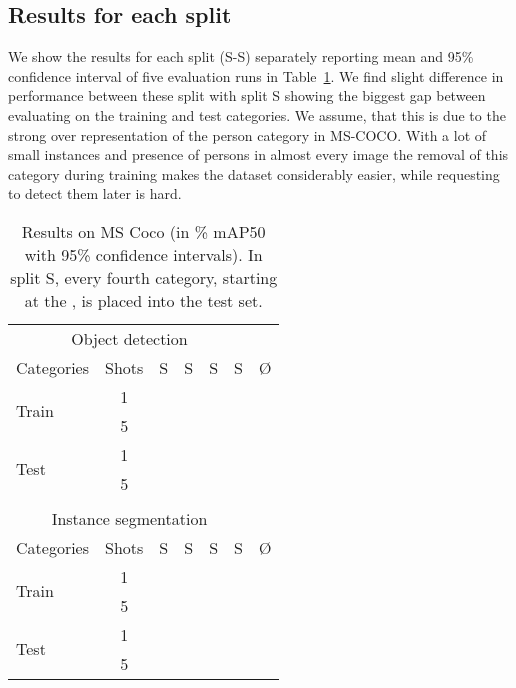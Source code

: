\documentclass{article}
\newcommand{\coco}{MS-COCO\xspace}
\begin{document}
\subsection{Results for each split}

We show the results for each split (S-S) separately reporting mean and 95\% confidence interval of five evaluation runs in Table~\ref{table:results_by_split}. We find slight difference in performance between these split with split S showing the biggest gap between evaluating on the training and test categories. We assume, that this is due to the strong over representation of the person category in \coco \cite{Lin2014}. With a lot of small instances and presence of persons in almost every image the removal of this category during training makes the dataset considerably easier, while requesting to detect them later is hard.

\begin{table}[h]
\begin{center}
\begin{small}
\begin{tabular}{lcccccc}
 \multicolumn{6}{c}{Object detection\vspace{4pt}}\\
Categories & Shots & S & S & S & S & \O\\
\hline
\multirow{2}{*}{Train} & 1 &  &  &  &  &  \\
 & 5 &  &  &  &  &  \\
\hline
\multirow{2}{*}{Test} & 1 &  &  &  &  &  \\ 
 & 5 &  &  &  &  &  \\
\multicolumn{6}{c}{}\\
 \multicolumn{6}{c}{Instance segmentation\vspace{4pt}} \\
Categories  & Shots & S & S & S & S & \O\\
 \hline
\multirow{2}{*}{Train} & 1 &  &  &  &  &  \\
 & 5 &  &  &  &  &  \\
\hline
\multirow{2}{*}{Test} & 1 &  &  &  &  &  \\
 & 5 &  &  &  &  &  \\
\end{tabular}
\end{small}
\end{center}
\caption{Results on MS Coco (in \% mAP50 with 95\% confidence intervals). In split S, every fourth category, starting at the , is placed into the test set.}
\label{table:results_by_split}
\end{table}
\end{document}
